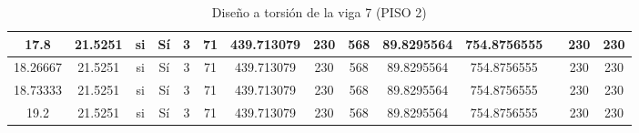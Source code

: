 \begin{table}[H]
{\begin{tabular}{|c|c|c|c|c|c|c|c|c|c|c|c|c|c|}
\hline
17.8 & 21.5251 & si  & Sí  & 3   & 71  & 439.713079 & 230 & 568 & 89.8295564 & 754.8756555 &     & 230 & 230 \bigstrut\\
\hline
18.26667 & 21.5251 & si  & Sí  & 3   & 71  & 439.713079 & 230 & 568 & 89.8295564 & 754.8756555 &     & 230 & 230 \bigstrut\\
\hline
18.73333 & 21.5251 & si  & Sí  & 3   & 71  & 439.713079 & 230 & 568 & 89.8295564 & 754.8756555 &     & 230 & 230 \bigstrut\\
\hline
19.2 & 21.5251 & si  & Sí  & 3   & 71  & 439.713079 & 230 & 568 & 89.8295564 & 754.8756555 &     & 230 & 230 \bigstrut\\
\hline
\end{tabular}%


%
  }
      \caption{Diseño a torsión de la viga 7 (PISO 2) }
  \label{tab:T VG7 P2 }%
\end{table}%

